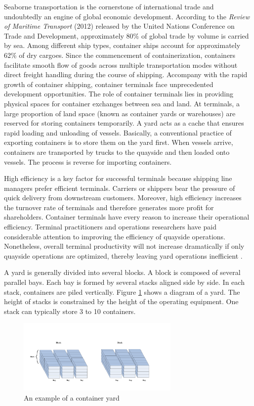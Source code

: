 \documentclass[review,3p,times,authoryear,12pt]{elsarticle}
\begin{document}
Seaborne transportation is the cornerstone of international trade and undoubtedly an engine of global economic development.
According to the \textit{Review of Maritime Transport} (2012) released by the United Nations Conference on Trade and Development, approximately 80\% of global trade by volume is carried by sea.
Among different ship types, container ships account for approximately 62\% of dry cargoes.
Since the commencement of containerization, containers facilitate smooth flow of goods across multiple transportation modes without direct freight handling during the course of shipping.
Accompany with the rapid growth of container shipping, container terminals face unprecedented development opportunities.
The role of container terminals lies in providing physical spaces for container exchanges between sea and land.
At terminals, a large proportion of land space (known as container yards or warehouses) are reserved for storing containers temporarily.
A yard acts as a cache that ensures rapid loading and unloading of vessels.
Basically, a conventional practice of exporting containers is to store them on the yard first.
When vessels arrive, containers are transported by trucks to the quayside and then loaded onto vessels.
The process is reverse for importing containers.

High efficiency is a key factor for successful terminals because shipping line managers prefer efficient terminals.
Carriers or shippers bear the pressure of quick delivery from downstream customers.
Moreover, high efficiency increases the turnover rate of terminals and therefore generates more profit for shareholders.
Container terminals have every reason to increase their operational efficiency. 
Terminal practitioners and operations researchers have paid considerable attention to improving the efficiency of quayside operations. 
Nonetheless, overall terminal productivity will not increase dramatically if only quayside operations are optimized, thereby leaving yard operations inefficient \citep{Jiang2012}.

A yard is generally divided into several blocks.
A block is composed of several parallel bays. 
Each bay is formed by several stacks aligned side by side. 
In each stack, containers are piled vertically. 
Figure \ref{fig:1} shows a diagram of a yard. 
The height of stacks is constrained by the height of the operating equipment. 
One stack can typically store 3 to 10 containers.

\begin{figure}[!htb]
\centering
\includegraphics[width=0.7\textwidth]{fig1.pdf}
\caption{An example of a container yard}
\label{fig:1}
\end{figure}
\end{document}
